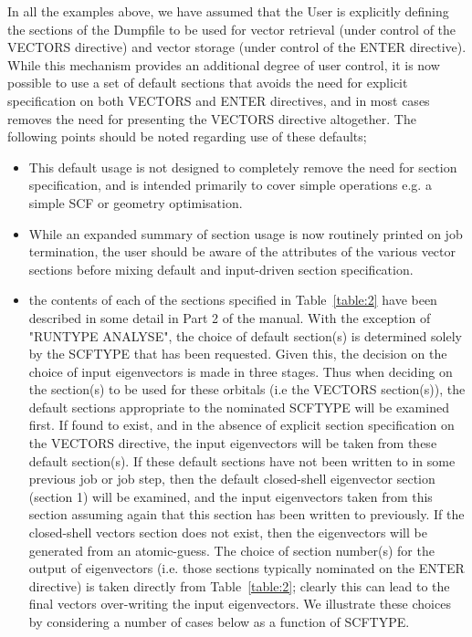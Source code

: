 \documentclass[11pt,fleqn]{article}
\begin{document}
In all the examples above, we have assumed that the User is explicitly
defining the sections of the Dumpfile to be used for vector retrieval
(under control of the VECTORS directive) and vector storage (under
control of the ENTER directive). While this mechanism provides an
additional degree of user control, it is now possible to use a set
of default sections that avoids the need for explicit specification
on both VECTORS and ENTER directives, and in most cases removes
the need for presenting the VECTORS directive altogether. The
following points should be noted regarding use of these defaults;
\begin{itemize}
\item This default usage is not designed to completely remove the need
for section specification, and is intended primarily to cover simple
operations e.g. a simple SCF or geometry optimisation.
\item While an expanded summary of section usage is now routinely
printed on job termination, the user should be aware of the attributes
of the various vector sections before mixing default and input-driven
section specification.
\item the contents of each of the sections specified in
Table~\ref{table:2} have been described in some detail in Part 2 of
the manual. With the exception of "RUNTYPE ANALYSE", the choice of
default section(s) is determined solely by the SCFTYPE that has been
requested. Given this, the decision on the choice of input eigenvectors is
made in three stages.  Thus when deciding on the section(s) to be used
for these orbitals (i.e the VECTORS section(s)), the default sections
appropriate to the nominated SCFTYPE will be examined first. If found
to exist, and in the absence of explicit section specification on the
VECTORS directive, the input eigenvectors will be taken from these default
section(s). If these default sections have not been written to in some
previous job or job step, then the default closed-shell eigenvector
section (section 1) will be examined, and the input eigenvectors taken
from this section assuming again that this section has been written
to previously. If the closed-shell vectors section does not exist,
then the eigenvectors will be generated from an atomic-guess. The
choice of section number(s) for the output of eigenvectors (i.e. those
sections typically nominated on the ENTER directive) is taken directly
from Table~\ref{table:2}; clearly this can lead to the final vectors
over-writing the input eigenvectors.  We illustrate these choices by
considering a number of cases below as a function of SCFTYPE.


\end{itemize}
\end{document}
